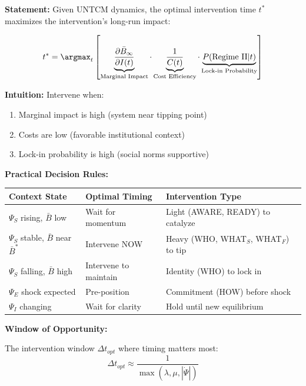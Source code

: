 \begin{tcolorbox}[colback=red!5!white, colframe=red!75!black,
    title=\textbf{Theorem NTM-T8: Optimal Intervention Timing Rule}]

\textbf{Statement:} Given UNTCM dynamics, the optimal intervention time $t^*$ maximizes the intervention's long-run impact:

\begin{equation}
t^* = \argmax_{t} \left[ \underbrace{\frac{\partial \bar{B}_\infty}{\partial I(t)}}_{\text{Marginal Impact}} \cdot \underbrace{\frac{1}{C(t)}}_{\text{Cost Efficiency}} \cdot \underbrace{P(\text{Regime II} | t)}_{\text{Lock-in Probability}} \right]
\label{eq:optimal-timing}
\end{equation}

\textbf{Intuition:} Intervene when:
\begin{enumerate}[nosep]
\item Marginal impact is high (system near tipping point)
\item Costs are low (favorable institutional context)
\item Lock-in probability is high (social norms supportive)
\end{enumerate}

\textbf{Practical Decision Rules:}

\begin{center}
\renewcommand{\arraystretch}{1.3}
\begin{tabular}{@{}lll@{}}
\toprule
\textbf{Context State} & \textbf{Optimal Timing} & \textbf{Intervention Type} \\
\midrule
$\Psi_S$ rising, $\bar{B}$ low & Wait for momentum & Light (AWARE, READY) to catalyze \\
$\Psi_S$ stable, $\bar{B}$ near $\bar{B}^*$ & Intervene NOW & Heavy (WHO, WHAT$_S$, WHAT$_F$) to tip \\
$\Psi_S$ falling, $\bar{B}$ high & Intervene to maintain & Identity (WHO) to lock in \\
$\Psi_E$ shock expected & Pre-position & Commitment (HOW) before shock \\
$\Psi_I$ changing & Wait for clarity & Hold until new equilibrium \\
\bottomrule
\end{tabular}
\end{center}

\textbf{Window of Opportunity:}

The intervention window $\Delta t_{opt}$ where timing matters most:
\begin{equation}
\Delta t_{opt} \approx \frac{1}{\max(\lambda, \mu, |\dot{\Psi}|)}
\end{equation}


\end{tcolorbox}
